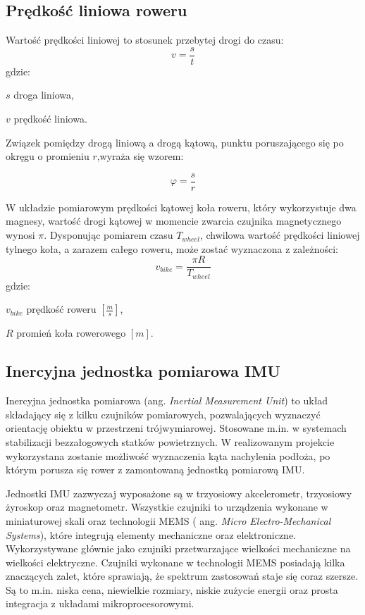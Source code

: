 \subsection{Prędkość liniowa roweru}
Wartość prędkości liniowej to stosunek przebytej drogi do czasu:
\begin{equation}
    v = \frac{s}{t}
\end{equation}
gdzie:
\begin{eqwhere}[2cm]
	\item[$s$] droga liniowa,
	\item[$v$] prędkość liniowa.
\end{eqwhere}
 Związek pomiędzy drogą liniową a drogą kątową, punktu poruszającego się po okręgu o promieniu $r$,wyraża się wzorem:

\begin{equation}
    \varphi = \frac{s}{r}
\end{equation}

W układzie pomiarowym prędkości kątowej koła roweru, który wykorzystuje dwa magnesy, wartość drogi kątowej w momencie zwarcia czujnika magnetycznego wynosi $\pi$. Dysponując pomiarem czasu $T_{wheel}$, chwilowa wartość prędkości liniowej tylnego koła, a zarazem całego roweru, może zostać wyznaczona z zależności:
 \begin{equation}
    \label{eq:zaleznoscNaPredkosc}
    v_{bike} = \frac{\pi R}{T_{wheel}}
\end{equation}
gdzie:
\begin{eqwhere}[2cm]
    \item[$v_{bike}$] prędkość roweru $[\frac{m}{s}]$,
	\item[$R$] promień koła rowerowego $[m]$.
\end{eqwhere}
\subsection{Inercyjna jednostka pomiarowa IMU}
Inercyjna jednostka pomiarowa (ang. {\em Inertial Measurement Unit}) to układ składający się z kilku czujników pomiarowych, pozwalających wyznaczyć orientację obiektu w przestrzeni trójwymiarowej. Stosowane m.in. w systemach stabilizacji bezzałogowych statków powietrznych. W realizowanym projekcie wykorzystana zostanie możliwość wyznaczenia kąta nachylenia podłoża, po którym porusza się rower z zamontowaną jednostką pomiarową IMU.

Jednostki IMU zazwyczaj wyposażone są w trzyosiowy akcelerometr, trzyosiowy żyroskop oraz magnetometr. Wszystkie czujniki to urządzenia wykonane w miniaturowej skali oraz technologii MEMS ( ang. {\em Micro Electro-Mechanical Systems}), które integrują elementy mechaniczne oraz elektroniczne. Wykorzystywane głównie jako czujniki przetwarzające wielkości mechaniczne na wielkości elektryczne. Czujniki wykonane w technologii MEMS posiadają kilka znaczących zalet, które sprawiają, że spektrum zastosowań staje się coraz szersze. Są to m.in. niska cena, niewielkie rozmiary, niskie zużycie energii oraz prosta integracja z układami mikroprocesorowymi. 

